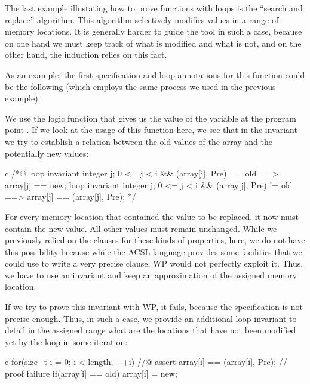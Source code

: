 \label{l4:statements-loops-ex-search-and-replace}


The last example illustating how to prove functions
with loops is the ``search and replace'' algorithm. This algorithm
selectively modifies values in a range of memory locations. It is
generally harder to guide the tool in such a case, because on one hand
we must keep track of what is modified and what is not, and on the other
hand, the induction relies on this fact.


As an example, the first specification and loop annotations for
this function could be the following (which employs the same process we
used in the previous example):




We use the logic function  that gives
us the value of the variable  at the program point .
If we look at the usage of this function here, we see that in the
invariant we try to establish a relation between the old values of the
array and the potentially new values:


\begin{CodeBlock}{c}
/*@
  loop invariant \forall integer j; 0 <= j < i && \at(array[j], Pre) == old
                   ==> array[j] == new;
  loop invariant \forall integer j; 0 <= j < i && \at(array[j], Pre) != old
                   ==> array[j] == \at(array[j], Pre);
*/
\end{CodeBlock}



For every memory location that contained the value to be replaced, it now must
contain the new value. All other values must remain unchanged. While we
previously relied on the  clauses for these kinds of properties,
here, we do not have this possibility because while the ACSL language provides
some facilities that we could use to write a very precise 
clause, WP would not perfectly exploit it. Thus, we have to use an invariant and
keep an approximation of the assigned memory location.


If we try to prove this invariant with WP, it fails, because the
 specification is not precise enough. Thus, in such a case,
we provide an additional loop invariant to detail in the assigned range what are
the locations that have not been modified yet by the loop in some iteration:


\begin{CodeBlock}{c}
for(size_t i = 0; i < length; ++i){
    //@ assert array[i] == \at(array[i], Pre); // proof failure
    if(array[i] == old) array[i] = new;
}
\end{CodeBlock}


